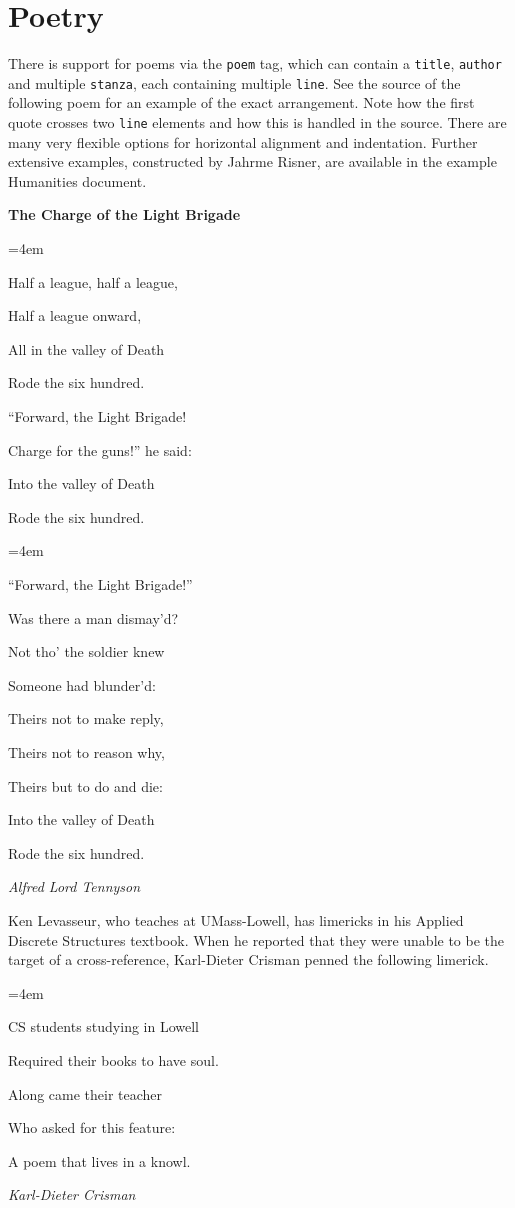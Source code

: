 \documentclass{sn-jnl}
\theoremstyle{thmstyleone}%
\theoremstyle{thmstyletwo}%
\theoremstyle{thmstylethree}%
\newcommand{\mono}[1]{\texttt{#1}}
\numberwithin{equation}{section}
\newenvironment{poem}{\setlength{\parindent}{0em}}{}
\newcommand{\poemTitle}[1]{\begin{center}\large\textbf{#1}\end{center}}
\newenvironment{stanza}{\vspace{0.25 em}\hangindent=4em}{\vspace{1 em}}
\newcommand{\poemauthorleft}[1]{\vspace{-1em}\begin{flushleft}\textit{#1}\end{flushleft}}
\newcommand{\poemlineleft}[1]{{\raggedright{#1}\par}\vspace{-\parskip}}
\begin{document}
\section{Poetry}\label{section-poetry}%
There is support for poems via the \mono{poem} tag, which can contain a \mono{title}, \mono{author} and multiple \mono{stanza}, each containing multiple \mono{line}.  See the source of the following poem for an example of the exact arrangement.  Note how the first quote crosses two \mono{line} elements and how this is handled in the source.  There are many very flexible options for horizontal alignment and indentation.  Further extensive examples, constructed by Jahrme Risner, are available in the example Humanities document.%
\begin{poem}\label{poem-light-brigade}%
\poemTitle{The Charge of the Light Brigade}
%
\begin{stanza}
\poemlineleft{Half a league, half a league,}
\poemlineleft{Half a league onward,}
\poemlineleft{All in the valley of Death}
\poemlineleft{Rode the six hundred.}
\poemlineleft{``Forward, the Light Brigade!}
\poemlineleft{Charge for the guns!'' he said:}
\poemlineleft{Into the valley of Death}
\poemlineleft{Rode the six hundred.}
\end{stanza}
\begin{stanza}
%
\poemlineleft{``Forward, the Light Brigade!''}
\poemlineleft{Was there a man dismay'd?}
\poemlineleft{Not tho' the soldier knew}
\poemlineleft{Someone had blunder'd:}
\poemlineleft{Theirs not to make reply,}
\poemlineleft{Theirs not to reason why,}
\poemlineleft{Theirs but to do and die:}
\poemlineleft{Into the valley of Death}
\poemlineleft{Rode the six hundred.}
\end{stanza}
\poemauthorleft{Alfred Lord Tennyson}
\end{poem}
Ken Levasseur, who teaches at UMass-Lowell, has limericks in his Applied Discrete Structures textbook.  When he reported that they were unable to be the target of a cross-reference, Karl-Dieter Crisman penned the following limerick.%
\begin{poem}%
\poemTitle{}
\begin{stanza}
\poemlineleft{CS students studying in Lowell}
\poemlineleft{Required their books to have soul.}
\poemlineleft{Along came their teacher}
\poemlineleft{Who asked for this feature:}
\poemlineleft{A poem that lives in a knowl.}
\end{stanza}
\poemauthorleft{Karl-Dieter Crisman}
\end{poem}
\end{document}
